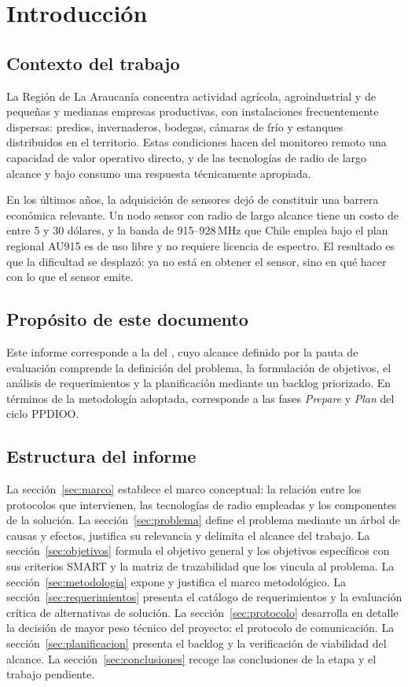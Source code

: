 \section{Introducción}

\subsection{Contexto del trabajo}

La Región de La Araucanía concentra actividad agrícola, agroindustrial y de pequeñas y medianas
empresas productivas, con instalaciones frecuentemente dispersas: predios, invernaderos, bodegas,
cámaras de frío y estanques distribuidos en el territorio. Estas condiciones hacen del monitoreo
remoto una capacidad de valor operativo directo, y de las tecnologías de radio de largo alcance y bajo
consumo una respuesta técnicamente apropiada.

En los últimos años, la adquisición de sensores dejó de constituir una barrera económica relevante. Un
nodo sensor con radio de largo alcance tiene un costo de entre 5 y 30 dólares, y la banda de
915--928\,MHz que Chile emplea bajo el plan regional AU915 es de uso libre y no requiere licencia de
espectro. El resultado es que la dificultad se desplazó: ya no está en obtener el sensor, sino en qué
hacer con lo que el sensor emite.

\subsection{Propósito de este documento}

Este informe corresponde a la \textbf{\datoEtapa} del \datoCurso{} \datoCodigo, cuyo alcance definido
por la pauta de evaluación comprende la definición del problema, la formulación de objetivos, el
análisis de requerimientos y la planificación mediante un backlog priorizado. En términos de la
metodología adoptada, corresponde a las fases \emph{Prepare} y \emph{Plan} del ciclo PPDIOO.

\subsection{Estructura del informe}

La sección~\ref{sec:marco} establece el marco conceptual: la relación entre los protocolos que
intervienen, las tecnologías de radio empleadas y los componentes de la solución. La
sección~\ref{sec:problema} define el problema mediante un árbol de causas y efectos, justifica su
relevancia y delimita el alcance del trabajo. La sección~\ref{sec:objetivos} formula el objetivo
general y los objetivos específicos con sus criterios SMART y la matriz de trazabilidad que los vincula
al problema. La sección~\ref{sec:metodologia} expone y justifica el marco metodológico. La
sección~\ref{sec:requerimientos} presenta el catálogo de requerimientos y la evaluación crítica de
alternativas de solución. La sección~\ref{sec:protocolo} desarrolla en detalle la decisión de mayor
peso técnico del proyecto: el protocolo de comunicación. La sección~\ref{sec:planificacion} presenta el
backlog y la verificación de viabilidad del alcance. La sección~\ref{sec:conclusiones} recoge las
conclusiones de la etapa y el trabajo pendiente.

